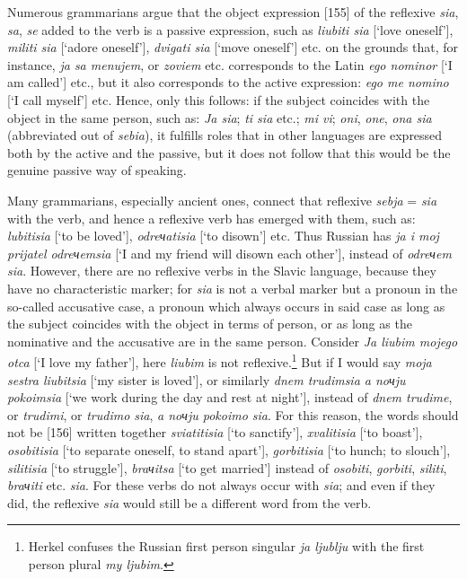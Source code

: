 Numerous grammarians argue that the object expression [155] of the reflexive \textit{sia}, \textit{sa}, \textit{se} added to the verb is a passive expression, such as \textit{liubiti sia} [‘love oneself’], \textit{militi sia} [‘adore oneself’], \textit{dvigati sia} [‘move oneself’] etc. on the grounds that, for instance, \textit{ja sa menujem}, or \textit{zoviem} etc. corresponds to the Latin \textit{ego nominor} [‘I am called’] etc., but it also corresponds to the active expression: \textit{ego me nomino} [‘I call myself’] etc. Hence, only this follows: if the subject coincides with the object in the same person, such as: \textit{Ja sia}; \textit{ti sia} etc.; \textit{mi vi}; \textit{oni}, \textit{one}, \textit{ona sia} (abbreviated out of \textit{sebia}), it fulfills roles that in other languages are expressed both by the active and the passive, but it does not follow that this would be the genuine passive way of speaking.

Many grammarians, especially ancient ones, connect that reflexive \textit{sebja} = \textit{sia} with the verb, and hence a reflexive verb has emerged with them, such as: \textit{lubitisia} [‘to be loved’], \textit{odreчatisia} [‘to disown’] etc. Thus Russian has \textit{ja i moj prijatel odreчemsia} [‘I and my friend will disown each other’], instead of \textit{odreчem sia}. However, there are no reflexive verbs in the Slavic language, because they have no characteristic marker; for \textit{sia} is not a verbal marker but a pronoun in the so-called accusative case, a pronoun which always occurs in said case as long as the subject coincides with the object in terms of person, or as long as the nominative and the accusative are in the same person. Consider \textit{Ja liubim mojego otca} [‘I love my father’], here \textit{liubim} is not reflexive.\footnote{Herkel confuses the Russian first person singular \textit{ja ljublju} with the first person plural \textit{my ljubim}.} But if I would say \textit{moja sestra liubitsia} [‘my sister is loved’], or similarly \textit{dnem trudimsia a noчju pokoimsia} [‘we work during the day and rest at night’], instead of \textit{dnem trudime}, or \textit{trudimi}, or \textit{trudimo sia}, \textit{a noчju pokoimo sia}. For this reason, the words should not be [156] written together \textit{sviatitisia} [‘to sanctify’], \textit{xvalitisia} [‘to boast’], \textit{osobitisia} [‘to separate oneself, to stand apart’], \textit{gorbitisia} [‘to hunch; to slouch’], \textit{silitisia} [‘to struggle’], \textit{braчitsa} [‘to get married’] instead of \textit{osobiti}, \textit{gorbiti}, \textit{siliti}, \textit{braчiti} etc. \textit{sia}. For these verbs do not always occur with \textit{sia}; and even if they did, the reflexive \textit{sia} would still be a different word from the verb.

